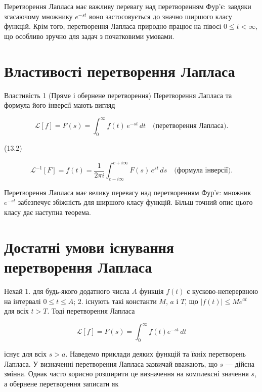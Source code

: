 \documentclass[
  ukrainian,
]{article}
\begin{document}
Перетворення Лапласа має важливу перевагу над перетворенням Фур'є:
завдяки згасаючому множнику \(e^{-st}\) воно застосовується до значно
ширшого класу функцій. Крім того, перетворення Лапласа природно працює
на півосі \(0 \le t < \infty\), що особливо зручно для задач з
початковими умовами.

\section{Властивості перетворення
Лапласа}\label{ux432ux43bux430ux441ux442ux438ux432ux43eux441ux442ux456-ux43fux435ux440ux435ux442ux432ux43eux440ux435ux43dux43dux44f-ux43bux430ux43fux43bux430ux441ux430}

Властивість 1 (Пряме і обернене перетворення) Перетворення Лапласа та
формула його інверсії мають вигляд

\[
\mathscr{L}[f] = F(s) = \int_{0}^{\infty} f(t) \, e^{-st} \, dt
\quad \text{(перетворення Лапласа).}
\]

(13.2)

\[
\mathscr{L}^{-1}[F] = f(t) = \frac{1}{2\pi i} \int_{c-i\infty}^{c+i\infty} F(s) \, e^{st} \, ds
\quad \text{(формула інверсії).}
\]

Перетворення Лапласа має велику перевагу над перетворенням Фур'є:
множник \(e^{-st}\) забезпечує збіжність для ширшого класу функцій.
Більш точний опис цього класу дає наступна теорема.

\section{Достатні умови існування перетворення
Лапласа}\label{ux434ux43eux441ux442ux430ux442ux43dux456-ux443ux43cux43eux432ux438-ux456ux441ux43dux443ux432ux430ux43dux43dux44f-ux43fux435ux440ux435ux442ux432ux43eux440ux435ux43dux43dux44f-ux43bux430ux43fux43bux430ux441ux430}

Нехай 1. для будь-якого додатного числа \(A\) функція \(f(t)\) є
кусково-неперервною на інтервалі \(0 \le t \le A\); 2. існують такі
константи \(M\), \(a\) і \(T\), що \(|f(t)| \le Me^{at}\) для всіх
\(t > T\). Тоді перетворення Лапласа

\[
\mathscr{L}[f] = F(s) = \int_0^\infty f(t)e^{-st}\,dt
\]

існує для всіх \(s > a\). Наведемо приклади деяких функцій та їхніх
перетворень Лапласа. У визначенні перетворення Лапласа зазвичай
вважають, що \(s\) --- дійсна змінна. Однак часто корисно розширити це
визначення на комплексні значення \(s\), а обернене перетворення
записати як
\end{document}
